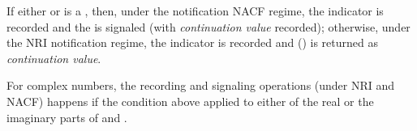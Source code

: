 \documentclass[../Comparisons-Predicates.tex]{subfiles}
\begin{document}
\DExceptional{}

If either  or  is a , then, under the notification NACF regime, the indicator
 is recorded and the
 is signaled (with
\emph{continuation value}  recorded); otherwise, under the
NRI notification regime, the indicator  is recorded and
 () is returned as \emph{continuation value}.

For complex numbers, the recording and signaling operations (under NRI
and NACF) happens if the condition above applied to either of the real
or the imaginary parts of  and .
\end{document}
